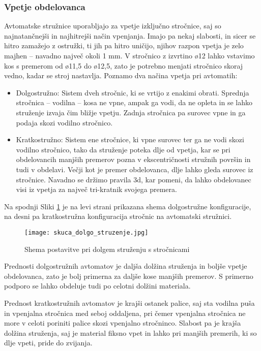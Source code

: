 \subsubsection{Vpetje obdelovanca}
Avtomatske stružnice uporabljajo za vpetje izključno stročnice,
saj so najnatančnejši in najhitrejši način vpenjanja. Imajo pa nekaj slabosti,
in sicer se hitro zamažejo z ostružki, ti jih pa hitro uničijo,
njihov razpon vpetja je zelo majhen -- navadno največ okoli 1 mm. V stročnico z
izvrtino ø12 lahko vstavimo kos s premerom od ø11,5 do ø12,5,
zato je potrebno menjati stročnico skoraj vedno, kadar se stroj nastavlja.
Poznamo dva načina vpetja pri avtomatih:
\begin{itemize}
	\item Dolgostružno: Sistem dveh stročnic, ki se vrtijo z
	      enakimi obrati. Sprednja stročnica -- vodilna -- kosa ne vpne,
	      ampak ga vodi, da ne opleta in se lahko struženje izvaja čim
	      bližje vpetju. Zadnja stročnica pa surovec vpne in ga podaja
	      skozi vodilno stročnico.
	\item Kratkostružno: Sistem ene stročnice, ki vpne surovec
	      ter ga ne vodi skozi vodilno stročnico, tako da struženje
	      poteka dlje od vpetja, kar se pri obdelovancih manjših
	      premerov pozna v ekscentričnosti stružnih površin in tudi v obdelavi.
	      Večji kot je premer obdelovanca, dlje lahko gleda surovec iz stročnice.
	      Navadno se držimo pravila 3d, kar pomeni, da lahko obdelovanec visi
	      iz vpetja za največ tri-kratnik svojega premera.
\end{itemize}

Na spodnji Sliki \ref{tipi_vodilnih_pus} je na levi strani prikazana
shema dolgostružne konfiguracije, na desni pa kratkostružna konfiguracija
stročnic na avtomatski stružnici.

\begin{figure}
	\begin{center}
		\texttt{[image: skuca\_dolgo\_struzenje.jpg]}
		\caption{Shema postavitve pri dolgem struženju s stročnicami
			\cite{interna}}
		\label{tipi_vodilnih_pus}
	\end{center}
\end{figure}

Prednosti dolgostružnih avtomatov je daljša dolžina struženja
in boljše vpetje obdelovanca, zato je bolj primerna za daljše
kose manjših premerov. S primerno podporo se lahko obdeluje
tudi po celotni dolžini materiala.

Prednost kratkostružnih avtomatov je krajši ostanek palice,
saj sta vodilna puša in vpenjalna stročnica med seboj oddaljena, pri čemer vpenjalna stročnica ne more v celoti poriniti palice skozi vpenjalno
stročninco. Slabost pa je krajša dolžina struženja, saj je material
fiksno vpet in lahko pri manjših premerih, ki so dlje vpeti, pride
do zvijanja.

